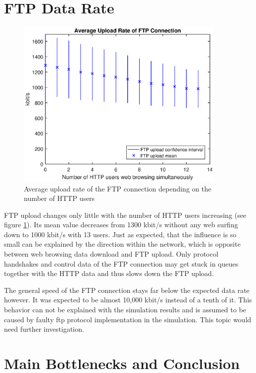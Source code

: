 \documentclass[a4paper,10pt]{book}\usepackage{graphicx}
\begin{document}
\section{FTP Data Rate}
\begin{figure}[!ht]
  \begin{center}
    \includegraphics[width=0.9\textwidth]{on_ftp_upload.eps}
    \caption{Average upload rate of the FTP connection depending on the number of HTTP users}
    \label{fig:onFtpUpload}
    \end{center}
\end{figure}

FTP upload changes only little with the number of HTTP users increasing (see figure \ref{fig:onFtpUpload}). Its mean value decreases from 1300 kbit/s without any web surfing down to 1000 kbit/s with 13 users. Just as expected, that the influence is so small can be explained by the direction within the network, which is opposite between web browsing data download and FTP upload. Only protocol handshakes and control data of the FTP connection may get stuck in queues together with the HTTP data and thus slows down the FTP upload.

The general speed of the FTP connection stays far below the expected data rate however. It was expected to be almost 10,000 kbit/s instead of a tenth of it. This behavior can not be explained with the simulation results and is assumed to be caused by faulty ftp protocol implementation in the simulation. This topic would need further investigation.

\section{Main Bottlenecks and Conclusion}
\end{document}
